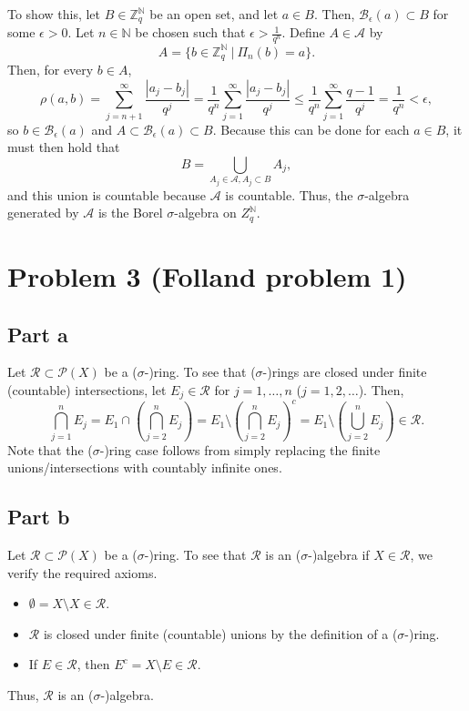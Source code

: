 \documentclass{article}
\begin{document}
To show this, let $B\in\mathbb{Z}_q^\mathbb{N}$ be an open set, and let $a\in B$. Then, $\mathcal B_\epsilon(a)\subset B$ for some $\epsilon>0$. Let $n\in\mathbb{N}$ be chosen such that $\epsilon>\frac{1}{q^n}$. Define $A\in\mathcal A$ by
\[
A=\{b\in\mathbb{Z}^\mathbb{N}_q~|~\Pi_n(b)=a\}.
\]
Then, for every $b\in A$,
\begin{equation*}
	\rho(a,b)=\sum_{j=n+1}^\infty\frac{|a_j-b_j|}{q^j}=\frac{1}{q^n}\sum_{j=1}^\infty\frac{|a_j-b_j|}{q^j}\leq\frac{1}{q^n}\sum_{j=1}^\infty\frac{q-1}{q^j}=\frac{1}{q^n}<\epsilon,
\end{equation*}
so $b\in\mathcal B_\epsilon(a)$ and $A\subset\mathcal B_\epsilon(a)\subset B$. Because this can be done for each $a\in B$, it must then hold that 
\[
B=\bigcup_{A_j\in\mathcal A,A_j\subset B}A_j,
\]
and this union is countable because $\mathcal A$ is countable. Thus, the $\sigma$-algebra generated by $\mathcal A$ is the Borel $\sigma$-algebra on $Z^{\mathbb N}_q$.

\section{Problem 3 (Folland problem 1)} 
\subsection{Part a}
Let $\mathcal R\subset\mathcal P(X)$ be a ($\sigma$-)ring. To see that ($\sigma$-)rings are closed under finite (countable) intersections, let $E_j\in\mathcal R$ for $j=1,\ldots,n$ ($j=1,2,\ldots$). Then,
\[
\bigcap_{j=1}^nE_j=E_1\cap\left(\bigcap_{j=2}^nE_j\right)=E_1\setminus\left(\bigcap_{j=2}^nE_j\right)^c=E_1\setminus\left(\bigcup_{j=2}^nE_j\right)\in\mathcal R.
\]
Note that the ($\sigma$-)ring case follows from simply replacing the finite unions/intersections with countably infinite ones.

\subsection{Part b}
Let $\mathcal R\subset\mathcal P(X)$ be a ($\sigma$-)ring. To see that $\mathcal R$ is an ($\sigma$-)algebra if $X\in\mathcal R$, we verify the required axioms.
\begin{itemize}
	\item $\emptyset=X\setminus X\in\mathcal R$.
	\item $\mathcal R$ is closed under finite (countable) unions by the definition of a ($\sigma$-)ring.
	\item If $E\in\mathcal R$, then $E^c=X\setminus E\in\mathcal R$.
\end{itemize}
Thus, $\mathcal R$ is an ($\sigma$-)algebra. 
\end{document}
